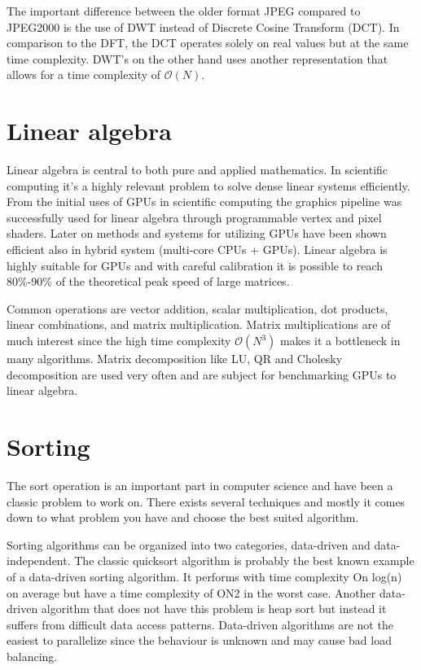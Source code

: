 The important difference between the older format JPEG compared to JPEG2000 is the use of DWT instead of Discrete Cosine Transform (DCT). In comparison to the DFT, the DCT operates solely on real values but at the same time complexity. DWT's on the other hand uses another representation that allows for a time complexity of $\mathcal{O}(N)$.

\section{Linear algebra}
Linear algebra is central to both pure and applied mathematics. In scientific computing it's a highly relevant problem to solve dense linear systems efficiently. From the initial uses of GPUs in scientific computing the graphics pipeline was successfully used for linear algebra through programmable vertex and pixel shaders\cite{Kruger2003}. Later on methods and systems for utilizing GPUs have been shown efficient also in hybrid system (multi-core CPUs + GPUs)\cite{Tomov2010}. Linear algebra is highly suitable for GPUs and with careful calibration it is possible to reach 80\%-90\% of the theoretical peak speed of large matrices\cite{Volkov2008}.

Common operations are vector addition, scalar multiplication, dot products, linear combinations, and matrix multiplication. Matrix multiplications are of much interest since the high time complexity $\mathcal{O}(N^3)$ makes it a bottleneck in many algorithms. Matrix decomposition like LU, QR and Cholesky decomposition are used very often and are subject for benchmarking GPUs to linear algebra\cite{Volkov2008}.

\section{Sorting}
The sort operation is an important part in computer science and have been a classic problem to work on. There exists several techniques and mostly it comes down to what problem you have and choose the best suited algorithm.

Sorting algorithms can be organized into two categories, data-driven and data-independent. The classic quicksort algorithm is probably the best known example of a data-driven sorting algorithm. It performs with time complexity On log(n) on average but have a time complexity of ON2 in the worst case. Another data-driven algorithm that does not have this problem is heap sort but instead it suffers from difficult data access patterns. Data-driven algorithms are not the easiest to parallelize since the behaviour is unknown and may cause bad load balancing.

